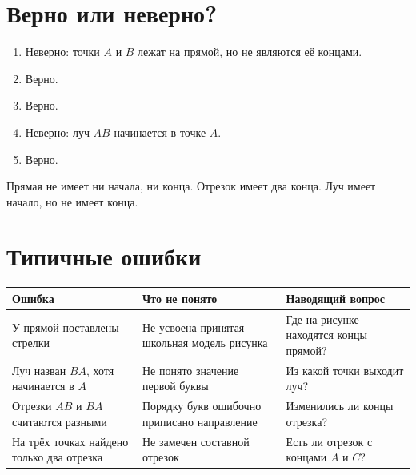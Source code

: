 \section{Верно или неверно?}

\begin{checkpointbox}
  \begin{enumerate}[label=\textbf{\arabic*.},itemsep=0.42em]
    \item Неверно: точки \(A\) и \(B\) лежат на прямой, но не являются её
      концами.
    \item Верно.
    \item Верно.
    \item Неверно: луч \(AB\) начинается в точке \(A\).
    \item Верно.
  \end{enumerate}
\end{checkpointbox}

\begin{teacherbox}
  Прямая не имеет ни начала, ни конца. Отрезок имеет два конца. Луч имеет
  начало, но не имеет конца.
\end{teacherbox}

\section{Типичные ошибки}

\begin{center}
  \renewcommand{\arraystretch}{1.4}
  \begin{tabularx}{\textwidth}{
    >{\raggedright\arraybackslash}p{}
    >{\raggedright\arraybackslash}p{}
    >{\raggedright\arraybackslash}X}
    \toprule
    \rowcolor{TableHeader}
    Ошибка & Что не понято & Наводящий вопрос \\
    \midrule
    У прямой поставлены стрелки
      & Не усвоена принятая школьная модель рисунка
      & Где на рисунке находятся концы прямой? \\
    \addlinespace[0.2em]
    Луч назван \(BA\), хотя начинается в \(A\)
      & Не понято значение первой буквы
      & Из какой точки выходит луч? \\
    \addlinespace[0.2em]
    Отрезки \(AB\) и \(BA\) считаются разными
      & Порядку букв ошибочно приписано направление
      & Изменились ли концы отрезка? \\
    \addlinespace[0.2em]
    На трёх точках найдено только два отрезка
      & Не замечен составной отрезок
      & Есть ли отрезок с концами \(A\) и \(C\)? \\
    \bottomrule
  \end{tabularx}
\end{center}
